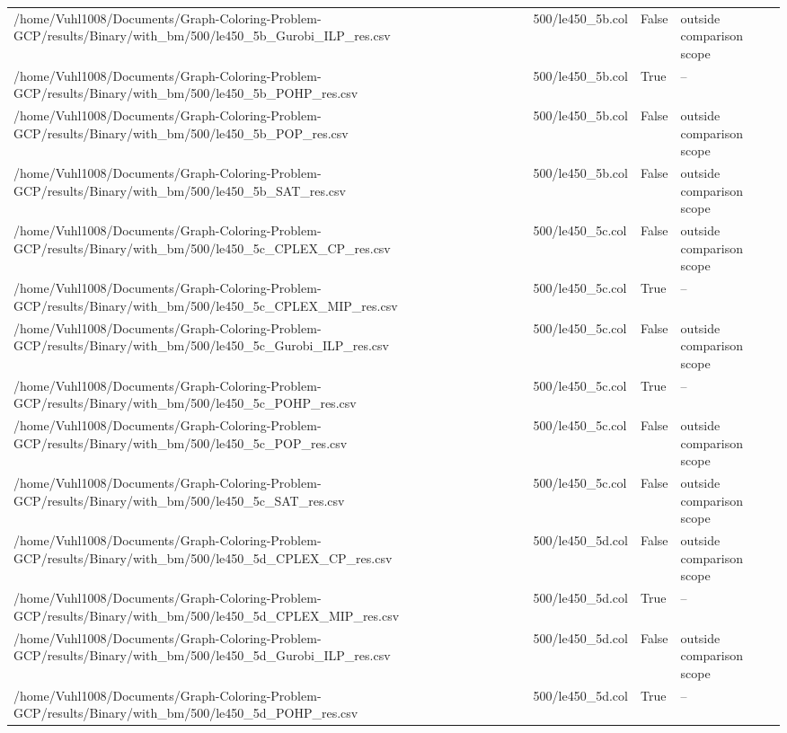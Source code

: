 \begin{table}[htbp]
\begin{tabular}{llll}
/home/Vuhl1008/Documents/Graph-Coloring-Problem-GCP/results/Binary/with\_bm/500/le450\_5b\_Gurobi\_ILP\_res.csv & 500/le450\_5b.col & False & outside comparison scope \\
/home/Vuhl1008/Documents/Graph-Coloring-Problem-GCP/results/Binary/with\_bm/500/le450\_5b\_POHP\_res.csv & 500/le450\_5b.col & True & -- \\
/home/Vuhl1008/Documents/Graph-Coloring-Problem-GCP/results/Binary/with\_bm/500/le450\_5b\_POP\_res.csv & 500/le450\_5b.col & False & outside comparison scope \\
/home/Vuhl1008/Documents/Graph-Coloring-Problem-GCP/results/Binary/with\_bm/500/le450\_5b\_SAT\_res.csv & 500/le450\_5b.col & False & outside comparison scope \\
/home/Vuhl1008/Documents/Graph-Coloring-Problem-GCP/results/Binary/with\_bm/500/le450\_5c\_CPLEX\_CP\_res.csv & 500/le450\_5c.col & False & outside comparison scope \\
/home/Vuhl1008/Documents/Graph-Coloring-Problem-GCP/results/Binary/with\_bm/500/le450\_5c\_CPLEX\_MIP\_res.csv & 500/le450\_5c.col & True & -- \\
/home/Vuhl1008/Documents/Graph-Coloring-Problem-GCP/results/Binary/with\_bm/500/le450\_5c\_Gurobi\_ILP\_res.csv & 500/le450\_5c.col & False & outside comparison scope \\
/home/Vuhl1008/Documents/Graph-Coloring-Problem-GCP/results/Binary/with\_bm/500/le450\_5c\_POHP\_res.csv & 500/le450\_5c.col & True & -- \\
/home/Vuhl1008/Documents/Graph-Coloring-Problem-GCP/results/Binary/with\_bm/500/le450\_5c\_POP\_res.csv & 500/le450\_5c.col & False & outside comparison scope \\
/home/Vuhl1008/Documents/Graph-Coloring-Problem-GCP/results/Binary/with\_bm/500/le450\_5c\_SAT\_res.csv & 500/le450\_5c.col & False & outside comparison scope \\
/home/Vuhl1008/Documents/Graph-Coloring-Problem-GCP/results/Binary/with\_bm/500/le450\_5d\_CPLEX\_CP\_res.csv & 500/le450\_5d.col & False & outside comparison scope \\
/home/Vuhl1008/Documents/Graph-Coloring-Problem-GCP/results/Binary/with\_bm/500/le450\_5d\_CPLEX\_MIP\_res.csv & 500/le450\_5d.col & True & -- \\
/home/Vuhl1008/Documents/Graph-Coloring-Problem-GCP/results/Binary/with\_bm/500/le450\_5d\_Gurobi\_ILP\_res.csv & 500/le450\_5d.col & False & outside comparison scope \\
/home/Vuhl1008/Documents/Graph-Coloring-Problem-GCP/results/Binary/with\_bm/500/le450\_5d\_POHP\_res.csv & 500/le450\_5d.col & True & -- \\

\end{tabular}
\end{table}
